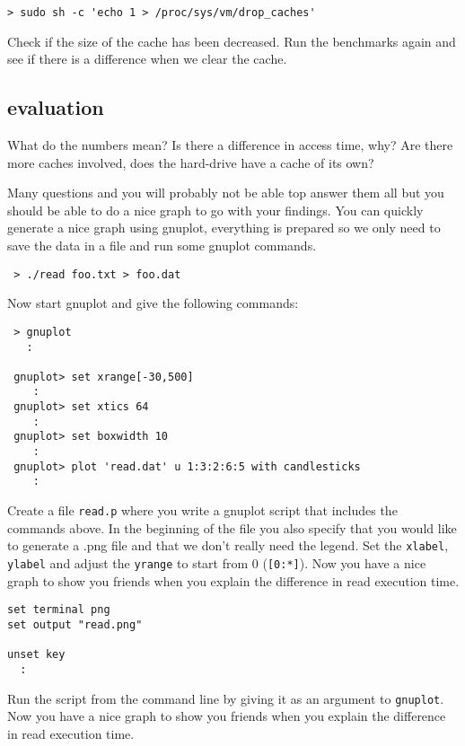 \documentclass[a4paper,11pt]{article}
\begin{document}
\begin{verbatim}
> sudo sh -c 'echo 1 > /proc/sys/vm/drop_caches'
\end{verbatim}

Check if the size of the cache has been decreased. Run the benchmarks
again and see if there is a difference when we clear the cache. 


\subsection*{evaluation}

What do the numbers mean? Is there a difference in access time, why?
Are there more caches involved, does the hard-drive have a cache of
its own?

Many questions and you will probably not be able top answer them all
but you should be able to do a nice graph to go with your
findings. You can quickly generate a nice graph using gnuplot,
everything is prepared so we only need to save the data in a file and
run some gnuplot commands.

\begin{verbatim}
 > ./read foo.txt > foo.dat
\end{verbatim}

Now start gnuplot and give the following commands:

\begin{verbatim}
 > gnuplot 
   :

 gnuplot> set xrange[-30,500]
    :
 gnuplot> set xtics 64
    :
 gnuplot> set boxwidth 10
    :
 gnuplot> plot 'read.dat' u 1:3:2:6:5 with candlesticks
    :
\end{verbatim}

Create a file {\tt read.p} where you write a gnuplot script that
includes the commands above. In the beginning of the file you also
specify that you would like to generate a .png file and that we don't
really need the legend. Set the {\tt xlabel}, {\tt ylabel} and adjust
the {\tt yrange} to start from 0 ({\tt [0:*]}). Now you have a nice
graph to show you friends when you explain the difference in read
execution time.


\begin{verbatim}
set terminal png
set output "read.png"

unset key
  :
\end{verbatim}

Run the script from the command line by giving it as an argument to
{\tt gnuplot}. Now you have a nice graph to show you friends when you
explain the difference in read execution time.
\end{document}
